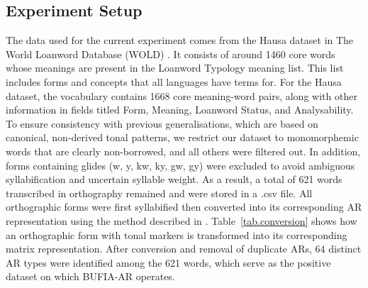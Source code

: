 \documentclass{CUP-JNL-PHO}%
\theoremstyle{definition}
\numberwithin{equation}{section}
\theoremstyle{definition}
\begin{document}
\subsection{Experiment Setup}
The data used for the current experiment comes from the Hausa dataset
\citep{wold-4} in The World Loanword Database (WOLD) \citep{wold}. It
consists of around 1460 core words whose meanings are present in the
Loanword Typology meaning list. This list includes forms and concepts
that all languages have terms for. For the Hausa dataset, the
vocabulary contains 1668 core meaning-word pairs, along with other
information in fields titled Form, Meaning, Loanword Status, and
Analysability. To ensure consistency with previous generalisations, 
which are based on canonical, non-derived tonal patterns,
we restrict our dataset to monomorphemic words that are clearly 
non-borrowed, and all others were filtered out. In addition, forms 
containing glides (\textipa{\texthtk}w, \textipa{\texthtk}y, kw, ky, gw, gy) 
were excluded to avoid 
ambiguous syllabification and uncertain syllable weight.
As a result, a total of 621 words transcribed in orthography
remained and were stored in a .csv file.
All orthographic forms were first syllabified \citep{kodner2016} then
converted into its corresponding AR representation using the method
described in \citet{jardine2015concatenation}. 
Table~\ref{tab.conversion} shows how an orthographic form with
tonal markers is transformed into its corresponding matrix
representation. After conversion and removal of duplicate ARs, 64
distinct AR types were identified among the 621 words, which serve as
the positive dataset on which BUFIA-AR operates.
\end{document}
